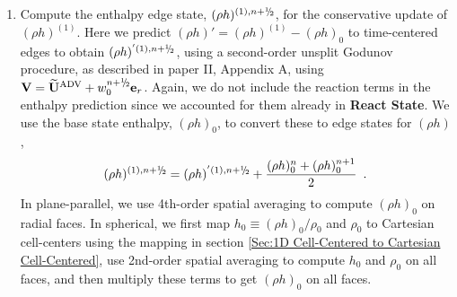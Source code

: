 \begin{description}
\begin{enumerate}
\begin{enumerate}
  \item Compute the enthalpy edge state, $(\rho h)^{(1),\nph}$, for
    the conservative update of $(\rho h)^{(1)}$. Here we predict 
    $(\rho h)' = (\rho h)^{(1)} - (\rho h)_0$
    to time-centered edges to obtain $(\rho h)^{'(1),\nph}$, 
    using a second-order unsplit Godunov procedure, 
    as described in paper II, Appendix A, using $\Vb =
    \uadvtwo+w_0^{\nph} \er$.  Again, we do not include the reaction
    terms in the enthalpy prediction since we accounted for them
    already in {\bf React State}. We use the base state enthalpy,
    $(\rho h)_0$, to convert these to edge states for $(\rho h)$,
\begin{equation}
(\rho h)^{(1),\nph} = 
(\rho h)^{'(1),\nph} + \frac{(\rho h)_0^n + (\rho h)_0^{n+1}}{2} \enskip .
\end{equation}
  In plane-parallel, we use 4th-order spatial averaging to compute $(\rho h)_0$
  on radial faces.  In spherical, we first map $h_0 \equiv (\rho h)_0/\rho_0$ 
  and $\rho_0$ to Cartesian cell-centers using the mapping in section 
  \ref{Sec:1D Cell-Centered to Cartesian Cell-Centered}, use 2nd-order spatial 
  averaging to compute $h_0$ and $\rho_0$ on all faces, and then multiply these 
  terms to get $(\rho h)_0$ on all faces.

\end{enumerate}
\end{enumerate}
\end{description}
